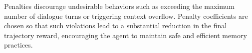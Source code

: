 Penalties discourage undesirable behaviors such as exceeding the maximum number of dialogue turns or triggering context overflow. Penalty coefficients are chosen so that such violations lead to a substantial reduction in the final trajectory reward, encouraging the agent to maintain safe and efficient memory practices.

